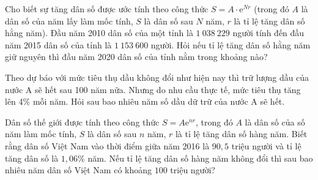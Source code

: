 \begin{bt}%
	Cho biết sự tăng dân số được ước tính theo công thức $S=A \cdot \mathrm{e}^{Nr}$ (trong đó $A$ là dân số của năm lấy làm mốc tính, $S$ là dân số sau $N$ năm, $r$ là tỉ lệ tăng dân số hằng năm). Đầu năm 2010 dân số của một tỉnh là $1~038~229$ người tính đến đầu năm 2015 dân số của tỉnh là $1~153~600$ người. Hỏi nếu tỉ lệ tăng dân số hằng năm giữ nguyên thì đầu năm 2020 dân số của tỉnh nằm trong khoảng nào?
	
\end{bt}
\begin{bt}%
	Theo dự báo với mức tiêu thụ dầu không đổi như hiện nay thì trữ lượng dầu của nước A sẽ hết sau 100 năm nữa. Nhưng do nhu cầu thực tế, mức tiêu thụ tăng lên 4\% mỗi năm. Hỏi sau bao nhiêu năm số dầu dữ trữ của nước A sẽ hết.
\end{bt}

\begin{bt}%
	Dân số thế giới được tính theo công thức $S=A\mathrm{e}^{nr}$, trong đó $A$ là dân số của số năm làm mốc tính, $S$ là dân số sau $n$ năm, $r$ là tỉ lệ tăng dân số hàng năm. Biết rằng dân số Việt Nam vào thời điểm giữa năm 2016 là $90,5$ triệu người và tỉ lệ tăng dân số là $1{,}06\%$ năm. Nếu tỉ lệ tăng dân số hàng năm không đổi thì sau bao nhiêu năm dân số Việt Nam có khoảng $100$ triệu người?
\end{bt}

